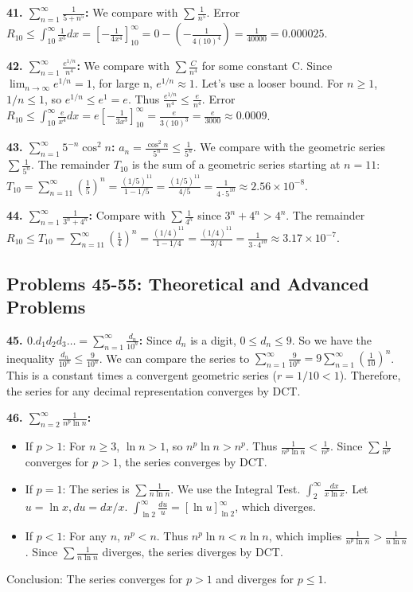 \documentclass{article}
\begin{document}
\textbf{41. \(\sum_{n=1}^{\infty} \frac{1}{5+n^5}\):} We compare with \(\sum \frac{1}{n^5}\). Error \(R_{10} \le \int_{10}^\infty \frac{1}{x^5} dx = [-\frac{1}{4x^4}]_{10}^\infty = 0 - (-\frac{1}{4(10)^4}) = \frac{1}{40000} = 0.000025\).

\textbf{42. \(\sum_{n=1}^{\infty} \frac{e^{1/n}}{n^4}\):} We compare with \(\sum \frac{C}{n^4}\) for some constant C. Since \(\lim_{n \to \infty} e^{1/n} = 1\), for large n, \(e^{1/n} \approx 1\). Let's use a looser bound. For \(n \ge 1\), \(1/n \le 1\), so \(e^{1/n} \le e^1 = e\). Thus \(\frac{e^{1/n}}{n^4} \le \frac{e}{n^4}\). Error \(R_{10} \le \int_{10}^\infty \frac{e}{x^4} dx = e[-\frac{1}{3x^3}]_{10}^\infty = \frac{e}{3(10)^3} = \frac{e}{3000} \approx 0.0009\).

\textbf{43. \(\sum_{n=1}^{\infty} 5^{-n} \cos^2 n\):} \(a_n = \frac{\cos^2 n}{5^n} \le \frac{1}{5^n}\). We compare with the geometric series \(\sum \frac{1}{5^n}\). The remainder \(T_{10}\) is the sum of a geometric series starting at \(n=11\): \(T_{10} = \sum_{n=11}^\infty (\frac{1}{5})^n = \frac{(1/5)^{11}}{1-1/5} = \frac{(1/5)^{11}}{4/5} = \frac{1}{4 \cdot 5^{10}} \approx 2.56 \times 10^{-8}\).

\textbf{44. \(\sum_{n=1}^{\infty} \frac{1}{3^n+4^n}\):} Compare with \(\sum \frac{1}{4^n}\) since \(3^n+4^n > 4^n\). The remainder \(R_{10} \le T_{10} = \sum_{n=11}^\infty (\frac{1}{4})^n = \frac{(1/4)^{11}}{1-1/4} = \frac{(1/4)^{11}}{3/4} = \frac{1}{3 \cdot 4^{10}} \approx 3.17 \times 10^{-7}\).

\subsection{Problems 45-55: Theoretical and Advanced Problems}

\textbf{45. \(0.d_1 d_2 d_3 \dots = \sum_{n=1}^\infty \frac{d_n}{10^n}\):} Since \(d_n\) is a digit, \(0 \le d_n \le 9\). So we have the inequality \(\frac{d_n}{10^n} \le \frac{9}{10^n}\). We can compare the series to \(\sum_{n=1}^\infty \frac{9}{10^n} = 9 \sum_{n=1}^\infty (\frac{1}{10})^n\). This is a constant times a convergent geometric series (\(r=1/10 < 1\)). Therefore, the series for any decimal representation converges by DCT.

\textbf{46. \(\sum_{n=2}^{\infty} \frac{1}{n^p \ln n}\):}
\begin{itemize}
    \item If \(p > 1\): For \(n \ge 3\), \(\ln n > 1\), so \(n^p \ln n > n^p\). Thus \(\frac{1}{n^p \ln n} < \frac{1}{n^p}\). Since \(\sum \frac{1}{n^p}\) converges for \(p>1\), the series converges by DCT.
    \item If \(p = 1\): The series is \(\sum \frac{1}{n \ln n}\). We use the Integral Test. \(\int_2^\infty \frac{dx}{x \ln x}\). Let \(u=\ln x, du=dx/x\). \(\int_{\ln 2}^\infty \frac{du}{u} = [\ln u]_{\ln 2}^\infty\), which diverges.
    \item If \(p < 1\): For any \(n\), \(n^p < n\). Thus \(n^p \ln n < n \ln n\), which implies \(\frac{1}{n^p \ln n} > \frac{1}{n \ln n}\). Since \(\sum \frac{1}{n \ln n}\) diverges, the series diverges by DCT.
\end{itemize}
Conclusion: The series converges for \(p>1\) and diverges for \(p \le 1\).
\end{document}
